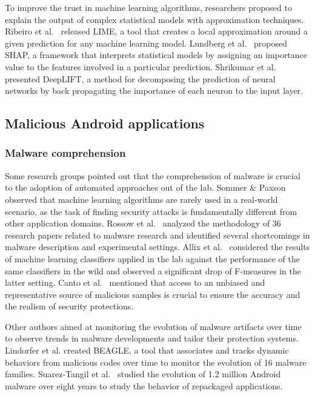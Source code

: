 To improve the trust in machine learning algorithms, researchers proposed to explain the output of complex statistical models with approximation techniques.
Ribeiro et al.~\cite{ribeiro_why_2016} released LIME, a tool that creates a local approximation around a given prediction for any machine learning model.
Lundberg et al.~\cite{lundberg_unified_2017} proposed SHAP, a framework that interprets statistical models by assigning an importance value to the features involved in a particular prediction.
Shrikumar et al.~\cite{shrikumar_learning_2017} presented DeepLIFT, a method for decomposing the prediction of neural networks by back propagating the importance of each neuron to the input layer.
\subsection{Malicious Android applications}
\subsubsection{Malware comprehension}
Some research groups pointed out that the comprehension of malware is crucial to the adoption of automated approaches out of the lab.
Sommer \& Paxson~\cite{sommer_outside_2010} observed that machine learning algorithms are rarely used in a real-world scenario, as the task of finding security attacks is fundamentally different from other application domains.
Rossow et al.~\cite{rossow_prudent_2012} analyzed the methodology of 36 research papers related to malware research and identified several shortcomings in malware description and experimental settings.
Allix et al.~\cite{allix_empirical_2016} considered the results of machine learning classifiers applied in the lab against the performance of the same classifiers in the wild and observed a significant drop of F-measures in the latter setting.
Canto et al.~\cite{canto_large_2017} mentioned that access to an unbiased and representative source of malicious samples is crucial to ensure the accuracy and the realism of security protections.

Other authors aimed at monitoring the evolution of malware artifacts over time to observe trends in malware developments and tailor their protection systems.
Lindorfer et al.\cite{lindorfer_lines_2012} created BEAGLE, a tool that associates and tracks dynamic behaviors from malicious codes over time to monitor the evolution of 16 malware families.
Suarez-Tangil et al.~\cite{suarez-tangil_eight_2018} studied the evolution of 1.2 million Android malware over eight years to study the behavior of repackaged applications.
